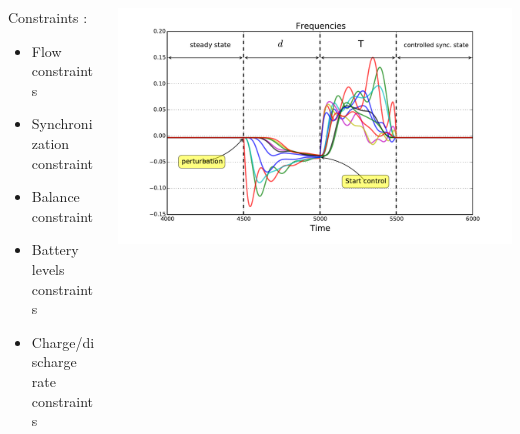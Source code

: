 \documentclass[xcolor=dvipsnames]{beamer}
\begin{document}
\begin{frame}
\begin{columns}
\begin{column}{.4\textwidth}
				Constraints :
				\begin{itemize}
					\item Flow constraints %
					\item Synchronization constraint %
					\item Balance constraint %
					\item Battery levels constraints %
					\item Charge/discharge rate constraints %
				\end{itemize}
		\end{column}
		\begin{column}{.6\textwidth}
			\includegraphics[scale=.3]{figure_2}
		\end{column}
	\end{columns}
\end{frame}
\end{document}
